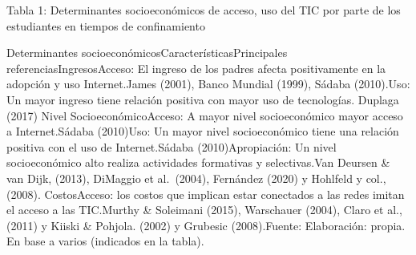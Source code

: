 Tabla 1: Determinantes socioeconómicos de acceso, uso del TIC por parte
de los estudiantes en tiempos de confinamiento

Determinantes socioeconómicosCaracterísticasPrincipales
referenciasIngresosAcceso: El ingreso de los padres afecta positivamente
en la adopción y uso Internet.James (2001), Banco Mundial (1999), Sádaba
(2010).Uso: Un mayor ingreso tiene relación positiva con mayor uso de
tecnologías. Duplaga (2017) Nivel SocioeconómicoAcceso: A mayor nivel
socioeconómico mayor acceso a Internet.Sádaba (2010)Uso: Un mayor nivel
socioeconómico tiene una relación positiva con el uso de Internet.Sádaba
(2010)Apropiación: Un nivel socioeconómico alto realiza actividades
formativas y selectivas.Van Deursen \& van Dijk, (2013), DiMaggio et
al.~(2004), Fernández (2020) y Hohlfeld y col., (2008). CostosAcceso:
los costos que implican estar conectados a las redes imitan el acceso a
las TIC.Murthy \& Soleimani (2015), Warschauer (2004), Claro et al.,
(2011) y Kiiski \& Pohjola. (2002) y Grubesic (2008).Fuente:
Elaboración: propia. En base a varios (indicados en la tabla).


